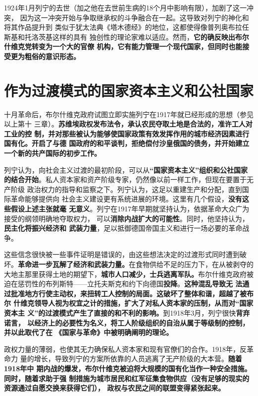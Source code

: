 1924年1月列宁的去世（加之他在去世前生病的18个月中影响有限），加剧了这一冲突，
因为这一冲突开始与争取继承权的斗争融合在一起。这导致对列宁的神化和将其作品提升到
类似于犹太法典《塔木德经》的地位，这都使得像普列奥布拉任斯基和托洛茨基这样的具有
独创性的理论家难以适应。然而，\textbf{它的确反映出布尔什维克党转变为一个大的官僚
机构，它有能力管理一个现代国家，但同时也能接受更为粗俗的意识形态。}

\section{作为过渡模式的国家资本主义和公社国家}

十月革命后，布尔什维克政府试图立即实施列宁在1917年就已经形成的思想（参见以上第十
三章）。\textbf{苏维埃政权发布法令，承认农民夺取土地是合法的，准许工人对工业的控
制，并对那些被认为能够使国家政策有效发挥作用的城市经济因素进行国有化。开启了与德
国政府的和平谈判，拒绝偿付沙皇俄国的债务，并开始建立一个新的共产国际的初步工作。}

列宁认为，向社会主义过渡的最初阶段，可以从\textbf{“国家资本主义”组织和公社国家
的结合开始}。私人资本家和资产阶级专家，仍然像以前一样工作，但现在要置于无产阶级
政治权力的指导和监察之下。列宁认为，这足以重建生产和分配，直到国际革命能够提供向
社会主义建设更有系统进展的环境。这里有几个假设，\textbf{没有这些假设上述主张就毫
无意义}。列宁在1917年早期就坚持认为，依据革命大众广为接受的纲领明确地夺取权力，
可以\textbf{消除内战扩大的可能性}。同时，他坚持认为，\textbf{民主化将振兴经济和
武装力量}，足以抵御德国帝国主义和进行一场必要的革命战争。

这些信念很快被一些事件证明是错误的，由这些想法决定的过渡形式同时遭到破
坏。\textbf{革命进一步瓦解了经济和武装力量。}在食物供给不足的压力下，在从被剥夺的
大地主那里获得土地的期望下，\textbf{城市人口减少，士兵逃离军队。}布尔什维克政府被
迫在惩罚性的布列斯特——立托夫斯克和约下向德国\textbf{投降}。\textbf{这种混乱导致无
  法通过批准地方行使主动权，来扭转工人控制的局面。这破坏了整体和谐，超越了被布尔
  什维克领导人视为权宜之计的措施，扩大了对私人资本家的压制，从而对“国家资本主
  义”的过渡模式产生了直接的和不利的影响。}到1918年3月，列宁很快\textbf{背弃诺言，
  以经济上的必要性为名义，将工人阶级组织的自治从属于等级制的控制，并以此取代了在
  《国家与革命》中被明确阐明的理论。}

政权力量的薄弱，也使其无力确保私人资本家和现有官僚们的合作。1918年，反革命力
量的增长，导致列宁的方案所依靠的人员逃离了无产阶级的大本营。\textbf{随着1918年中
期内战的爆发，布尔什维克被迫将大规模的国有化当作一种安全措施。同时，随着求助于强
制措施为城市居民和红军征集食物供应（没有足够的现实的资源通过自愿交换来获得它们），
政权与农民之间的联盟变得紧张起来。}

